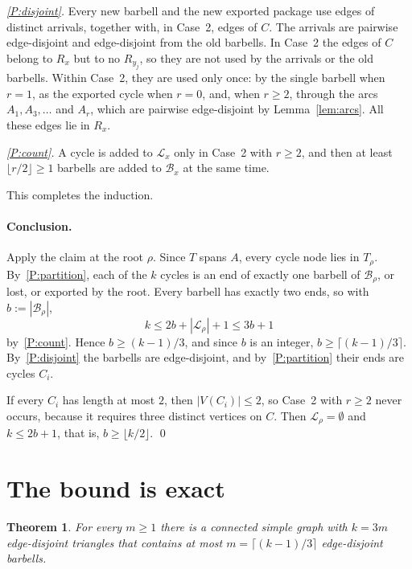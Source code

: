\documentclass[11pt,a4paper]{article}
\newtheorem{theorem}{Theorem}
\theoremstyle{definition}
\theoremstyle{remark}
\begin{document}
\emph{\ref{P:disjoint}.} Every new barbell and the new exported package use
edges of distinct arrivals, together with, in Case~2, edges of \(C\). The
arrivals are pairwise edge-disjoint and edge-disjoint from the old barbells.
In Case~2 the edges of \(C\) belong to \(R_x\) but to no \(R_{y_j}\), so they
are not used by the arrivals or the old barbells. Within Case~2, they are used
only once: by the single barbell when \(r=1\), as the exported cycle when
\(r=0\), and, when \(r\ge2\), through the arcs \(A_1,A_3,\dots\) and \(A_r\),
which are pairwise edge-disjoint by Lemma~\ref{lem:arcs}. All these edges lie
in \(R_x\).

\emph{\ref{P:count}.} A cycle is added to \(\mathcal L_x\) only in Case~2 with
\(r\ge2\), and then at least \(\lfloor r/2\rfloor\ge1\) barbells are added to
\(\mathcal B_x\) at the same time.

This completes the induction.

\paragraph{Conclusion.}
Apply the claim at the root \(\rho\). Since \(T\) spans \(A\), every cycle node
lies in \(T_\rho\). By~\ref{P:partition}, each of the \(k\) cycles is an end of
exactly one barbell of \(\mathcal B_\rho\), or lost, or exported by the root.
Every barbell has exactly two ends, so with \(b:=|\mathcal B_\rho|\),
\[
  k\le 2b+|\mathcal L_\rho|+1\le 3b+1
\]
by~\ref{P:count}. Hence \(b\ge(k-1)/3\), and since \(b\) is an integer,
\(b\ge\lceil(k-1)/3\rceil\). By~\ref{P:disjoint} the barbells are
edge-disjoint, and by~\ref{P:partition} their ends are cycles \(C_i\).

If every \(C_i\) has length at most \(2\), then \(|V(C_i)|\le2\), so Case~2 with
\(r\ge2\) never occurs, because it requires three distinct vertices on \(C\).
Then \(\mathcal L_\rho=\emptyset\) and \(k\le2b+1\), that is,
\(b\ge\lfloor k/2\rfloor\). \qed

\section{The bound is exact}

\begin{theorem}\label{thm:tight}
For every \(m\ge1\) there is a connected simple graph with \(k=3m\)
edge-disjoint triangles that contains at most \(m=\lceil(k-1)/3\rceil\)
edge-disjoint barbells.
\end{theorem}
\end{document}
